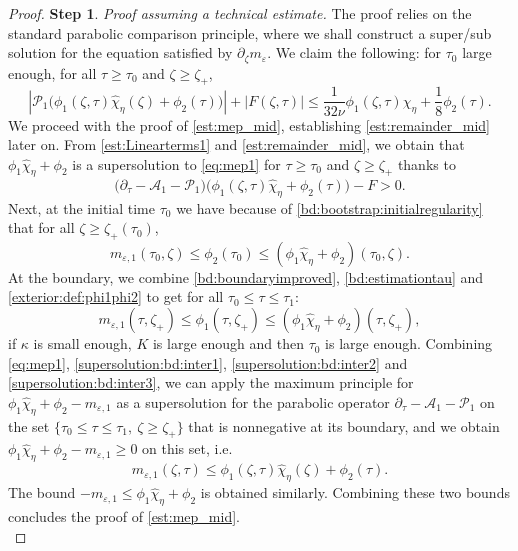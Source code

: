 \documentclass[11pt]{aims}
\theoremstyle{definition}
\newcommand{\ep}{\varepsilon}
\newcommand{\Pc}{\mathcal{P}}
\newcommand{\As}{\mathscr{A}}
\newcommand{\pa}{\partial}
\newcommand{\be}{\begin{equation}}
\newcommand{\ee}{\end{equation}}
\numberwithin{equation}{section}
\begin{document}
\begin{proof}
\textbf{Step 1}. \emph{Proof assuming a technical estimate.} The proof relies on the standard parabolic comparison principle, where we shall construct a super/sub solution for the equation satisfied by $\pa_\zeta m_\ep$. We claim the following: for $\tau_0$ large enough, for all $\tau\geq \tau_0$ and $\zeta \geq \zeta_+$,
\begin{equation}\label{est:remainder_mid}
\left| \Pc_1 \big(\phi_1(\zeta, \tau) \hat \chi_{\eta}(\zeta) + \phi_2(\tau)  \big) \right|  +|F(\zeta, \tau)| \leq  \frac{1}{32\nu}\phi_1(\zeta, \tau) \hat \chi_{\eta} + \frac{1}{8}\phi_2(\tau).
\end{equation}
We proceed with the proof of \eqref{est:mep_mid}, establishing \eqref{est:remainder_mid} later on. From \eqref{est:Linearterms1} and \eqref{est:remainder_mid}, we obtain that $\phi_1 \hat \chi_{\eta}+ \phi_2$ is a supersolution to \eqref{eq:mep1} for $\tau \geq \tau_0 $ and $\zeta \geq \zeta_+ $ thanks to \begin{equation} \label{supersolution:bd:inter1}
\big(\pa_\tau  - \As_1 - \Pc_1\big) \big(\phi_1(\zeta, \tau) \hat \chi_{\eta}+ \phi_2(\tau) \big)  - F > 0 .
\end{equation}
Next, at the initial time $\tau_0$ we have because of \eqref{bd:bootstrap:initialregularity} that for all $\zeta\geq \zeta_+(\tau_0)$,
\be \label{supersolution:bd:inter2}
m_{\varepsilon,1}(\tau_0,\zeta)\leq  \phi_2(\tau_0)\leq (\phi_1\hat \chi_{\eta}+ \phi_2)( \tau_0,\zeta).
\ee
At the boundary, we combine \eqref{bd:boundaryimproved}, \eqref{bd:estimationtau} and \eqref{exterior:def:phi1phi2} to get for all $\tau_0\leq \tau \leq \tau_1$:
\be \label{supersolution:bd:inter3}
m_{\varepsilon,1}(\tau,\zeta_+) \leq \phi_1( \tau,\zeta_+) \leq (\phi_1\hat \chi_{\eta}+ \phi_2) (\tau,\zeta_+),
\ee
if $\kappa$ is small enough, $K$ is large enough and then $\tau_0$ is large enough. Combining \eqref{eq:mep1}, \eqref{supersolution:bd:inter1}, \eqref{supersolution:bd:inter2} and \eqref{supersolution:bd:inter3}, we can apply the maximum principle for $\phi_1\hat \chi_{\eta}+ \phi_2-m_{\varepsilon,1}$ as a supersolution for the parabolic operator $\pa_\tau  - \As_1 - \Pc_1$ on the set $\{\tau_0\leq \tau \leq \tau_1, \ \zeta\geq \zeta_+\}$ that is nonnegative at its boundary, and we obtain $\phi_1 \hat \chi_{\eta}+ \phi_2-m_{\varepsilon,1}\geq 0$ on this set, i.e.
$$
m_{\varepsilon,1}(\zeta,\tau)\leq \phi_1(\zeta, \tau) \hat \chi_{\eta}(\zeta)+ \phi_2(\tau).
$$
The bound $-m_{\varepsilon,1}\leq \phi_1 \hat \chi_{\eta}+ \phi_2$ is obtained similarly. Combining these two bounds concludes the proof of \eqref{est:mep_mid}.\\

\end{proof}
\end{document}
